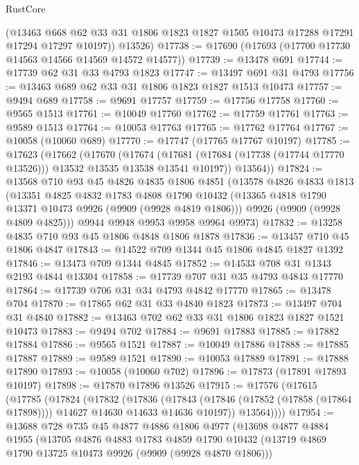 \begin{lexlean}{RustCore}
\begin{coremodule}
        (@13463 @668 @62 @33 @31 @1806 @1823 @1827 @1505 @10473 @17288 @17291 @17294 @17297 @10197))
      @13526)
@17738 := @17690 (@17693 (@17700 @17730 @14563 @14566 @14569 @14572 @14577))
@17739 := @13478 @691
@17744 := @17739 @62 @31 @33 @4793 @1823
@17747 := @13497 @691 @31 @4793
@17756 := @13463 @689 @62 @33 @31 @1806 @1823 @1827 @1513 @10473
@17757 := @9494 @689
@17758 := @9691 @17757
@17759 := @17756 @17758
@17760 := @9565 @1513
@17761 := @10049 @17760
@17762 := @17759 @17761
@17763 := @9589 @1513
@17764 := @10053 @17763
@17765 := @17762 @17764
@17767 := @10058 (@10060 @689)
@17770 := @17747 (@17765 @17767 @10197)
@17785 := @17623
    (@17662
      (@17670
        (@17674
          (@17681 (@17684 (@17738 (@17744 @17770 @13526))) @13532 @13535 @13538 @13541 @10197))
        @13564))
@17824 := @13568
    @710
    @93
    @45
    @4826
    @4835
    @1806
    @4851
    (@13578
      @4826
      @4833
      @1813
      (@13351
        @4825
        @4832
        @1783
        @4808
        @1790
        @10432
        (@13365 @4818 @1790 @13371 @10473 @9926 (@9909 (@9928 @4819 @1806)))
        @9926
        (@9909 (@9928 @4809 @4825)))
      @9944
      @9948
      @9953
      @9958
      @9964
      @9973)
@17832 := @13258 @4835 @710 @93 @45 @1806 @4848 @1806 @1878
@17836 := @13457 @710 @45 @1806 @4847
@17843 := @14522 @709 @1344 @45 @1806 @4845 @1827 @1392
@17846 := @13473 @709 @1344 @4845
@17852 := @14533 @708 @31 @1343 @2193 @4844 @13304
@17858 := @17739 @707 @31 @35 @4793 @4843 @17770
@17864 := @17739 @706 @31 @34 @4793 @4842 @17770
@17865 := @13478 @704
@17870 := @17865 @62 @31 @33 @4840 @1823
@17873 := @13497 @704 @31 @4840
@17882 := @13463 @702 @62 @33 @31 @1806 @1823 @1827 @1521 @10473
@17883 := @9494 @702
@17884 := @9691 @17883
@17885 := @17882 @17884
@17886 := @9565 @1521
@17887 := @10049 @17886
@17888 := @17885 @17887
@17889 := @9589 @1521
@17890 := @10053 @17889
@17891 := @17888 @17890
@17893 := @10058 (@10060 @702)
@17896 := @17873 (@17891 @17893 @10197)
@17898 := @17870 @17896 @13526
@17915 := @17576
    (@17615
      (@17785
        (@17824
          (@17832
            (@17836
              (@17843
                (@17846 (@17852 (@17858 (@17864 @17898))))
                @14627
                @14630
                @14633
                @14636
                @10197))
            @13564))))
@17954 := @13688
    @728
    @735
    @45
    @4877
    @4886
    @1806
    @4977
    (@13698
      @4877
      @4884
      @1955
      (@13705
        @4876
        @4883
        @1783
        @4859
        @1790
        @10432
        (@13719 @4869 @1790 @13725 @10473 @9926 (@9909 (@9928 @4870 @1806)))

\end{coremodule}
\end{lexlean}
